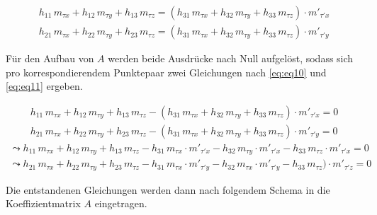 
\begin{gather}
	h_{11}\,m_{\tau x}+h_{12}\,m_{\tau y}+h_{13}\,m_{\tau z}= (h_{31}\,m_{\tau x}+h_{32}\,m_{\tau y}+h_{33}\,m_{\tau z}) \cdot m'_{\tau' x}\\
	h_{21}\,m_{\tau x}+h_{22}\,m_{\tau y}+h_{23}\,m_{\tau z}= (h_{31}\,m_{\tau x}+h_{32}\,m_{\tau y}+h_{33}\,m_{\tau z}) \cdot m'_{\tau' y}
\end{gather}

Für den Aufbau von $A$ werden beide Ausdrücke nach Null aufgelöst, sodass sich pro korrespondierendem Punktepaar zwei Gleichungen nach \ref{eq:eq10} und \ref{eq:eq11} ergeben.

\begin{gather*}
	h_{11}\,m_{\tau x}+h_{12}\,m_{\tau y}+h_{13}\,m_{\tau z} -(h_{31}\,m_{\tau x}+h_{32}\,m_{\tau y}+h_{33}\,m_{\tau z}) \cdot m'_{\tau' x}= 0 \\	h_{21}\,m_{\tau x}+h_{22}\,m_{\tau y}+h_{23}\,m_{\tau z}-(h_{31}\,m_{\tau x}+h_{32}\,m_{\tau y}+h_{33}\,m_{\tau z}) \cdot m'_{\tau' y}=0
\end{gather*}
\begin{gather}
	\leadsto h_{11}\,m_{\tau x}+h_{12}\,m_{\tau y}+h_{13}\,m_{\tau z} -h_{31}\,m_{\tau x}\cdot m'_{\tau' x} - h_{32}\,m_{\tau y} \cdot m'_{\tau' x}-h_{33}\,m_{\tau z}\cdot m'_{\tau' x}= 0 \label{eq:eq10}\\
	\leadsto h_{21}\,m_{\tau x}+h_{22}\,m_{\tau y}+h_{23}\,m_{\tau z}-h_{31}\,m_{\tau x}\cdot m'_{\tau' y} -h_{32}\,m_{\tau x} \cdot m'_{\tau' y} -h_{33}\,m_{\tau z}) \cdot m'_{\tau' z}=0 \label{eq:eq11}
\end{gather}

Die entstandenen Gleichungen werden dann nach folgendem Schema in die Koeffizientmatrix $A$ eingetragen.\cite{Elements,HZ,Schwarz,Heipke}

